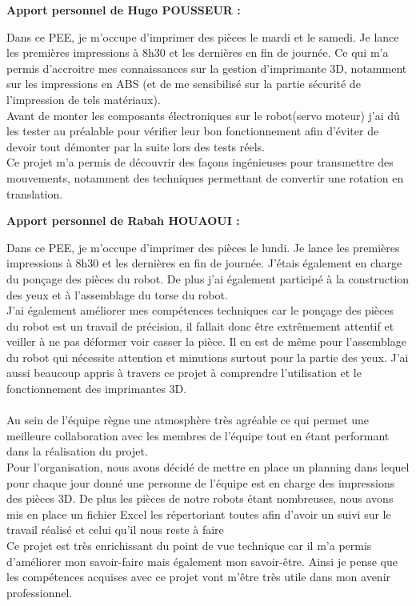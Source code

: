 \documentclass[12pt, oneside]{article}
\begin{document}
\vspace{1cm}
\textcolor{bleu}{\Large{\textbf{Apport personnel de Hugo POUSSEUR :}}}
\vspace{0.5cm}

Dans ce PEE, je m'occupe d'imprimer des pièces le mardi et le samedi. Je lance les premières impressions à 8h30 et les dernières en fin de journée.  Ce qui m'a permis d'accroitre mes connaissances sur la gestion d'imprimante 3D, notamment sur les impressions en ABS (et de me sensibilisé sur la partie sécurité de l'impression de tels matériaux).\\ 
Avant de monter les composants électroniques sur le robot(servo moteur) j'ai dû les tester au préalable pour vérifier leur bon fonctionnement afin d'éviter de devoir tout démonter par la suite lors des tests réels.\\
 Ce projet m'a permis de découvrir des façons ingénieuses pour transmettre des mouvements, notamment des techniques permettant de convertir une rotation en translation.



\vspace{1cm}
\textcolor{bleu}{\Large{\textbf{Apport personnel de Rabah HOUAOUI :}}}
\vspace{0.5cm}

Dans ce PEE, je m'occupe d'imprimer des pièces le lundi. Je lance les premières impressions à 8h30 et les dernières en fin de journée. J'étais également en charge du ponçage des pièces du robot. De plus j'ai également participé à la construction des yeux et à l'assemblage du torse du robot.  \\
J'ai également améliorer mes compétences techniques car le ponçage des pièces du robot est un travail de précision, il fallait donc être extrêmement attentif et veiller à ne pas déformer voir casser la pièce. Il en est de même pour l'assemblage du robot qui nécessite attention et minutions surtout pour la partie des yeux. J'ai aussi beaucoup appris à travers ce projet à comprendre l'utilisation et le fonctionnement des imprimantes 3D. 
\paragraph{} Au sein de l'équipe règne une atmosphère très agréable ce qui permet une meilleure collaboration avec les membres de l'équipe tout en étant performant dans la réalisation du projet. \\
Pour l'organisation, nous avons décidé de mettre en place un planning dans lequel pour chaque jour donné une personne de l'équipe est en charge des impressions des pièces 3D. De plus les pièces de notre robots étant nombreuses, nous avons mis en place un fichier Excel les répertoriant toutes afin d'avoir un suivi sur le travail réalisé et celui qu'il nous reste à faire \\
Ce projet est très enrichissant du point de vue technique car il m'a permis d'améliorer mon savoir-faire mais également mon savoir-être. Ainsi je pense que les compétences acquises avec ce projet vont m'être très utile dans mon avenir professionnel. 
\end{document}
